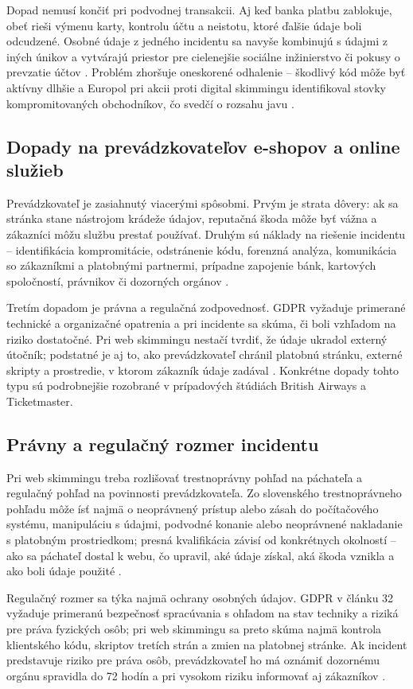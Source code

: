 Dopad nemusí končiť pri podvodnej transakcii. Aj keď banka platbu zablokuje, obeť rieši výmenu karty, kontrolu účtu a neistotu, ktoré ďalšie údaje boli odcudzené. Osobné údaje z jedného incidentu sa navyše kombinujú s údajmi z iných únikov a vytvárajú priestor pre cielenejšie sociálne inžinierstvo či pokusy o prevzatie účtov \cite{gdpr2016}. Problém zhoršuje oneskorené odhalenie -- škodlivý kód môže byť aktívny dlhšie a Europol pri akcii proti digital skimmingu identifikoval stovky kompromitovaných obchodníkov, čo svedčí o rozsahu javu \cite{europol2023action}.

\subsection{Dopady na prevádzkovateľov e-shopov a online služieb}

Prevádzkovateľ je zasiahnutý viacerými spôsobmi. Prvým je strata dôvery: ak sa stránka stane nástrojom krádeže údajov, reputačná škoda môže byť vážna a zákazníci môžu službu prestať používať. Druhým sú náklady na riešenie incidentu -- identifikácia kompromitácie, odstránenie kódu, forenzná analýza, komunikácia so zákazníkmi a platobnými partnermi, prípadne zapojenie bánk, kartových spoločností, právnikov či dozorných orgánov \cite{pciSsc2025PaymentPage,gdpr2016}.

Tretím dopadom je právna a regulačná zodpovednosť. GDPR vyžaduje primerané technické a organizačné opatrenia a pri incidente sa skúma, či boli vzhľadom na riziko dostatočné. Pri web skimmingu nestačí tvrdiť, že údaje ukradol externý útočník; podstatné je aj to, ako prevádzkovateľ chránil platobnú stránku, externé skripty a prostredie, v ktorom zákazník údaje zadával \cite{gdpr2016,pciSsc2025PaymentPage}. Konkrétne dopady tohto typu sú podrobnejšie rozobrané v prípadových štúdiách British Airways a Ticketmaster.

\subsection{Právny a regulačný rozmer incidentu}

Pri web skimmingu treba rozlišovať trestnoprávny pohľad na páchateľa a regulačný pohľad na povinnosti prevádzkovateľa. Zo slovenského trestnoprávneho pohľadu môže ísť najmä o neoprávnený prístup alebo zásah do počítačového systému, manipuláciu s údajmi, podvodné konanie alebo neoprávnené nakladanie s platobným prostriedkom; presná kvalifikácia závisí od konkrétnych okolností -- ako sa páchateľ dostal k webu, čo upravil, aké údaje získal, aká škoda vznikla a ako boli údaje použité \cite{slovakCriminalCode2005}.

Regulačný rozmer sa týka najmä ochrany osobných údajov. GDPR v článku 32 vyžaduje primeranú bezpečnosť spracúvania s ohľadom na stav techniky a riziká pre práva fyzických osôb; pri web skimmingu sa preto skúma najmä kontrola klientského kódu, skriptov tretích strán a zmien na platobnej stránke. Ak incident predstavuje riziko pre práva osôb, prevádzkovateľ ho má oznámiť dozornému orgánu spravidla do 72 hodín a pri vysokom riziku informovať aj zákazníkov \cite{gdpr2016,pciSsc2025PaymentPage}.
